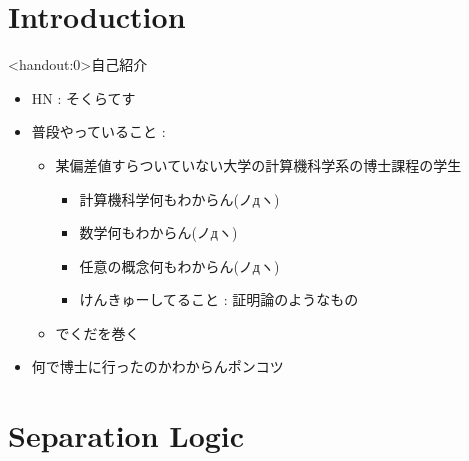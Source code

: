 \documentclass[notheorems, aspectratio=169, 12pt, unicode]{beamer}
\begin{document}
\begin{frame}
 \titlepage
\end{frame}

 \section{Introduction}
 
 \begin{frame}<handout:0>{自己紹介}
  \begin{itemize}
   \item HN : そくらてす
   \item 普段やっていること :
	 \begin{itemize}
	  \item 某偏差値すらついていない大学の計算機科学系の博士課程の学生 \pause
		\begin{itemize}
		 \item \alert{計算機科学何もわからん(ノдヽ)} \pause
		 \item \alert{数学何もわからん(ノдヽ)} \pause
		 \item \alert{任意の概念何もわからん(ノдヽ)} \pause
		 \item けんきゅーしてること : 証明論のようなもの \pause
		\end{itemize}
	  \item {} でくだを巻く \pause 
	 \end{itemize}
   \item 何で博士に行ったのかわからんポンコツ 
  \end{itemize}
 \end{frame}
 
 \section{Separation Logic}
\end{document}
